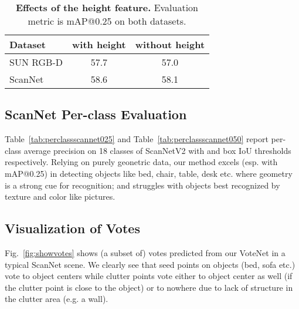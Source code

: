 \documentclass[10pt,twocolumn,letterpaper]{article}
\newcommand\votenet{VoteNet}
\begin{document}
\begin{table}[]
    \centering
    \begin{tabular}{l|c|c}
    \toprule
         Dataset & with height & without height \\ \midrule
         SUN RGB-D & 57.7 & 57.0 \\ \hline
         ScanNet & 58.6 & 58.1 \\ \bottomrule
    \end{tabular}
    \caption{\textbf{Effects of the height feature.} Evaluation metric is mAP@0.25 on both datasets.}
    \label{tab:height}
\end{table}

\subsection{ScanNet Per-class Evaluation}
\label{sec:percat_scannet}

Table~\ref{tab:perclassscannet025} and Table~\ref{tab:perclassscannet050} report per-class average precision on 18 classes of ScanNetV2 with  and  box IoU thresholds respectively. Relying on purely geonetric data, our method excels (esp. with mAP@0.25) in detecting objects like bed, chair, table, desk etc. where geometry is a strong cue for recognition; and struggles with objects best recognized by texture and color like pictures.


\subsection{Visualization of Votes}
\label{sec:more_vis}
Fig.~\ref{fig:showvotes} shows (a subset of) votes predicted from our \votenet{} in a typical ScanNet scene. We clearly see that seed points on objects (bed, sofa etc.) vote to object centers while clutter points vote either to object center as well (if the clutter point is close to the object) or to nowhere due to lack of structure in the clutter area (e.g. a wall).
 
\end{document}
